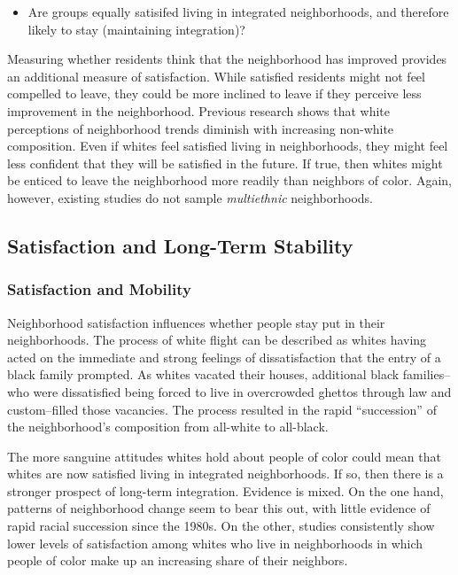\documentclass{baderart}
\providecommand{\tightlist}{%
  \setlength{\itemsep}{0pt}\setlength{\parskip}{0pt}}
\begin{document}
\begin{itemize}
\tightlist
\item
  Are groups equally satisifed living in integrated neighborhoods, and
  therefore likely to stay (maintaining integration)?
\end{itemize}

Measuring whether residents think that the neighborhood has improved provides an additional measure of satisfaction. While satisfied residents might not feel compelled to leave, they could be more inclined to leave if they perceive less improvement in the neighborhood. Previous research shows that white perceptions of neighborhood trends diminish with increasing non-white composition. Even if whites feel satisfied living in neighborhoods, they might feel less confident that they will be satisfied in the future. If true, then whites might be enticed to leave the neighborhood more readily than neighbors of color. Again, however, existing studies do not sample \emph{multiethnic} neighborhoods.

\subsection{Satisfaction and Long-Term Stability}\label{satisfaction-and-long-term-stability}

\subsubsection{Satisfaction and Mobility}\label{satisfaction-and-mobility}

Neighborhood satisfaction influences whether people stay put in their neighborhoods. The process of white flight can be described as whites having acted on the immediate and strong feelings of dissatisfaction that the entry of a black family prompted. As whites vacated their houses, additional black families--who were dissatisfied being forced to live in overcrowded ghettos through law and custom--filled those vacancies. The process resulted in the rapid ``succession'' of the neighborhood's composition from all-white to all-black.

The more sanguine attitudes whites hold about people of color could mean that whites are now satisfied living in integrated neighborhoods. If so, then there is a stronger prospect of long-term integration. Evidence is mixed. On the one hand, patterns of neighborhood change seem to bear this out, with little evidence of rapid racial succession since the 1980s. On the other, studies consistently show lower levels of satisfaction among whites who live in neighborhoods in which people of color make up an increasing share of their neighbors.
\end{document}
